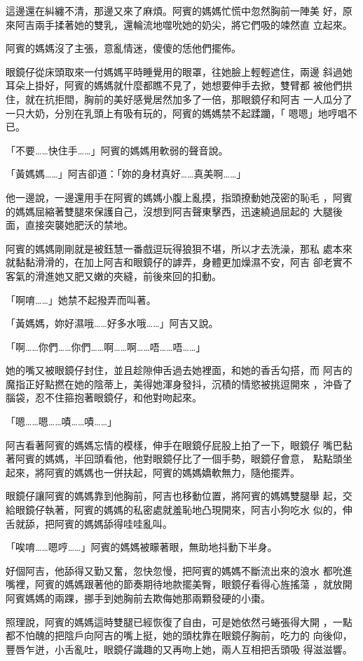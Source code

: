 這邊還在糾纏不清，那邊又來了麻煩。阿賓的媽媽忙慌中忽然胸前一陣美
好，原來阿吉兩手揉著她的雙乳，還輪流地噬吮她的奶尖，將它們吸的竦然直
立起來。

阿賓的媽媽沒了主張，意亂情迷，傻傻的恁他們擺佈。

眼鏡仔從床頭取來一付媽媽平時睡覺用的眼罩，往她臉上輕輕遮住，兩邊
斜過她耳朵上掛好，阿賓的媽媽就什麼都瞧不見了，她想要伸手去掀，雙臂都
被他們拱住，就在抗拒間，胸前的美好感覺居然加多了一倍，那眼鏡仔和阿吉
一人瓜分了一只大奶，分別在乳頭上有吸有玩的，阿賓的媽媽禁不起蹂躪，「
嗯嗯」地哼唱不已。

「不要……快住手……」阿賓的媽媽用軟弱的聲音說。

「黃媽媽……」阿吉卻道：「妳的身材真好……真美啊……」

他一邊說，一邊還用手在阿賓的媽媽小腹上亂摸，指頭撩動她茂密的恥毛
，阿賓的媽媽屈縮著雙腿來保護自己，沒想到阿吉聲東擊西，迅速繞過屈起的
大腿後面，直接突襲她肥沃的禁地。

阿賓的媽媽剛剛就是被鈺慧一番戲逗玩得狼狽不堪，所以才去洗澡，那私
處本來就黏黏滑滑的，在加上阿吉和眼鏡仔的謼弄，身體更加燥濕不安，阿吉
卻老實不客氣的滑進她又肥又嫩的夾縫，前後來回的扣動。

「啊唷……」她禁不起撥弄而叫著。

「黃媽媽，妳好濕哦……好多水哦……」阿吉又說。

「啊……你們……你們……啊……啊……唔……唔……」

她的嘴又被眼鏡仔封住，並且趁隙伸舌過去她裡面，和她的香舌勾搭，而
阿吉的魔指正好點撚在她的陰蒂上，美得她渾身發抖，沉積的情慾被挑逗開來
，沖昏了腦袋，忍不住箍抱著眼鏡仔，和他對吻起來。

「嗯……嗯……嘖……嘖……」

阿吉看著阿賓的媽媽忘情的模樣，伸手在眼鏡仔屁股上拍了一下，眼鏡仔
嘴巴黏著阿賓的媽媽，半回頭看他，他對眼鏡仔比了一個手勢，眼鏡仔會意，
點點頭坐起來，將阿賓的媽媽也一併扶起，阿賓的媽媽嬌軟無力，隨他擺弄。

眼鏡仔讓阿賓的媽媽靠到他胸前，阿吉也移動位置，將阿賓的媽媽雙腿舉
起，交給眼鏡仔執著，阿賓的媽媽的私密處就羞恥地凸現開來，阿吉小狗吃水
似的，伸舌就舔，把阿賓的媽媽舔得哇哇亂叫。

「唉唷……嗯哼……」阿賓的媽媽被矇著眼，無助地抖動下半身。

好個阿吉，他舔得又勤又奮，忽快忽慢，把阿賓的媽媽不斷流出來的浪水
都吮進嘴裡，阿賓的媽媽跟著他的節奏期待地款擺美臀，眼鏡仔看得心旌搖蕩
，就放開阿賓媽媽的兩踝，挪手到她胸前去欺侮她那兩顆發硬的小棗。

照理說，阿賓的媽媽這時雙腿已經恢復了自由，可是她依然弓蜷張得大開
，一點都不怕醜的把陰戶向阿吉的嘴上挺，她的頭枕靠在眼鏡仔胸前，吃力的
向後仰，豐唇乍迸，小舌亂吐，眼鏡仔識趣的又再吻上她，兩人互相把舌頭吸
得滋滋響。


